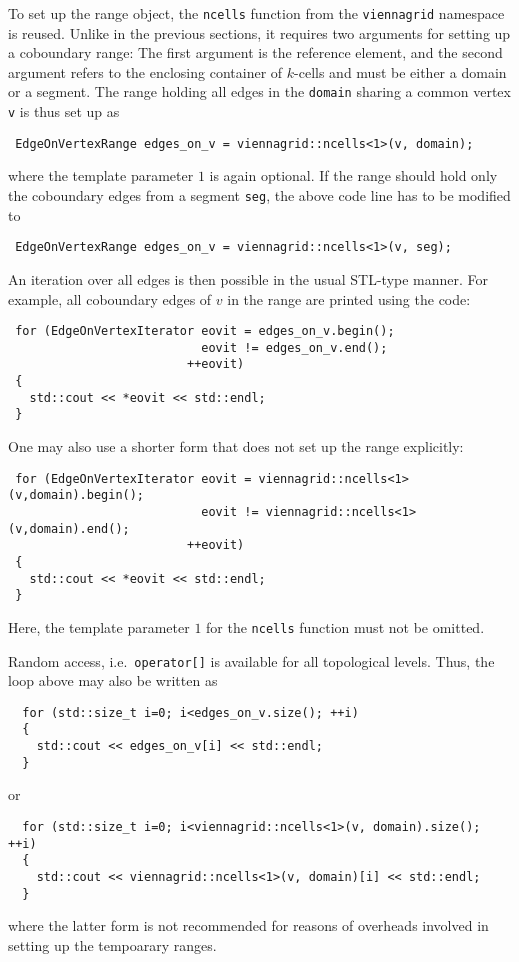 To set up the range object, the \lstinline|ncells| function from the \lstinline|viennagrid| namespace is reused. Unlike in the previous sections, it requires two arguments
for setting up a coboundary range: The first argument is the reference element, and the second argument refers to the enclosing container of $k$-cells and must be either a domain or a segment.
The range holding all edges in the \lstinline|domain| sharing a common vertex \lstinline|v| is thus set up as
\begin{lstlisting}
 EdgeOnVertexRange edges_on_v = viennagrid::ncells<1>(v, domain);
\end{lstlisting}
where the template parameter $1$ is again optional.
If the range should hold only the coboundary edges from a segment \lstinline|seg|, the above code line has to be modified to
\begin{lstlisting}
 EdgeOnVertexRange edges_on_v = viennagrid::ncells<1>(v, seg);
\end{lstlisting}
An iteration over all edges is then possible in the usual STL-type manner. For example, all coboundary edges of $v$ in the range are printed using the code:
\begin{lstlisting}
 for (EdgeOnVertexIterator eovit = edges_on_v.begin();
                           eovit != edges_on_v.end();
                         ++eovit)
 {
   std::cout << *eovit << std::endl;
 }
\end{lstlisting}
One may also use a shorter form that does not set up the range explicitly:
\begin{lstlisting}
 for (EdgeOnVertexIterator eovit = viennagrid::ncells<1>(v,domain).begin();
                           eovit != viennagrid::ncells<1>(v,domain).end();
                         ++eovit)
 {
   std::cout << *eovit << std::endl;
 }
\end{lstlisting}
Here, the template parameter $1$ for the \lstinline|ncells| function must not be omitted.

Random access, i.e.~\lstinline|operator[]| is available for all topological levels. Thus, the loop above may also be written as
\begin{lstlisting}
  for (std::size_t i=0; i<edges_on_v.size(); ++i)
  {
    std::cout << edges_on_v[i] << std::endl;
  }
\end{lstlisting}
or 
\begin{lstlisting}
  for (std::size_t i=0; i<viennagrid::ncells<1>(v, domain).size(); ++i)
  {
    std::cout << viennagrid::ncells<1>(v, domain)[i] << std::endl;
  }
\end{lstlisting}
where the latter form is not recommended for reasons of overheads involved in setting up the tempoarary ranges.


